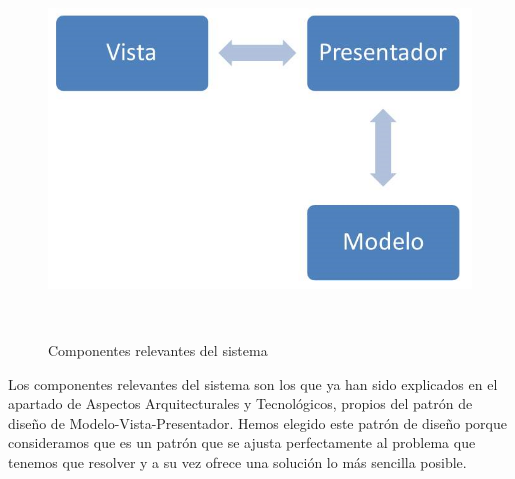 \vspace{.2cm}
\begin{figure}[ht]
\centerline{\includegraphics[scale=0.6]{img/componentes}}\
\caption{Componentes relevantes del sistema}
\label{fig:diagCompon}
\end{figure}

Los componentes relevantes del sistema son los que ya han sido explicados en el apartado de Aspectos Arquitecturales y Tecnológicos, propios del patrón de diseño de Modelo-Vista-Presentador. Hemos elegido este patrón de diseño porque consideramos que es un patrón que se ajusta perfectamente al problema que tenemos que resolver y a su vez ofrece una solución lo más sencilla posible.